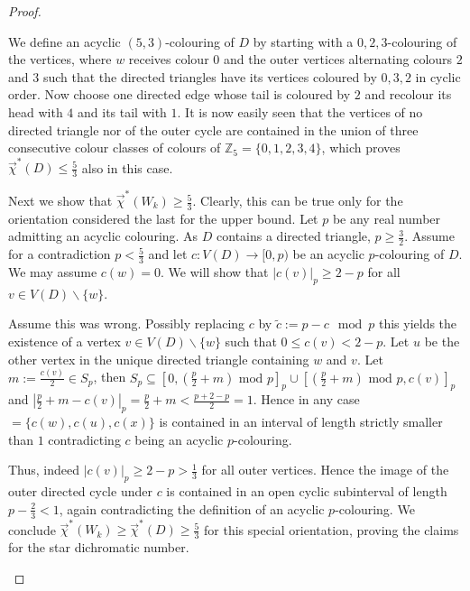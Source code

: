 \documentclass[fontsize=11pt,a4paper,DIV12]{scrartcl}
\theoremstyle{meiner}
\theoremstyle{definition}
\begin{document}
\begin{proof}
\begin{itemize}
  We define an acyclic $(5,3)$-colouring of $D$ by starting with a
  $0,2,3$-colouring of the vertices, where $w$ receives colour $0$ and
  the outer vertices alternating colours $2$ and $3$ such that the
  directed triangles have its vertices coloured by $0,3,2$ in cyclic
  order. Now choose one directed edge whose tail is coloured by $2$
  and recolour its head with $4$ and its tail with $1$. It is now
  easily seen that the vertices of no directed triangle nor of the
  outer cycle are contained in the union of three consecutive colour classes of
   colours of $\mathbb{Z}_5=\{0,1,2,3,4\}$, which
  proves $\vec{\chi}^\ast(D) \leq \frac{5}{3}$ also in this case.

  Next we show that $\vec{\chi}^\ast(W_k) \ge \frac{5}{3}$.  Clearly,
  this can be true only for the orientation considered the last for
  the upper bound.  Let $p$ be any real number admitting an acyclic
  colouring. As $D$ contains a directed triangle, $p \ge \frac{3}{2}$.
  Assume for a contradiction $ p<\frac{5}{3}$ and let $c:V(D)
  \rightarrow [0,p)$ be an acyclic $p$-colouring of $D$.  We may
  assume $c(w)=0$.  We will show that $|c(v)|_p \ge 2-p$ for all $v
  \in V(D)\backslash \{w\}$.  

  Assume this was wrong.  Possibly replacing $c$ by $\tilde c := p-c
  \mod p$ this yields the existence of a vertex $v \in V(D)\backslash
  \{w\}$ such that $0 \le c(v) < 2-p$.  Let $u$ be the other vertex in
  the unique directed triangle containing $w$ and $v$. Let
  $m:=\frac{c(v)}{2} \in S_p$, then $S_p \subseteq [0,(\frac{p}{2}+m)
  \text{ mod }p]_p \cup [(\frac{p}{2}+m) \text{ mod }p, c(v)]_p$ and
  $|\frac{p}{2}+m -c(v)|_p = \frac{p}{2} + m < \frac{p+2-p}{2}=1$.
  Hence in any case $= \{c(w),c(u),c(x)\}$ is contained in an
  interval of length strictly smaller than $1$ contradicting $c$
  being an acyclic $p$-colouring.

  Thus, indeed $|c(v)|_p \ge 2-p>\frac{1}{3}$ for all outer vertices.
  Hence the image of the outer directed cycle under $c$ is contained
  in an open cyclic subinterval of length $p-\frac{2}{3}<1$, again
  contradicting the definition of an acyclic $p$-colouring. We
  conclude $\vec{\chi}^\ast(W_k) \ge \vec{\chi}^\ast(D) \ge
  \frac{5}{3}$ for this special orientation, proving the claims for
  the star dichromatic number.
  

\end{itemize}
\end{proof}
\end{document}
